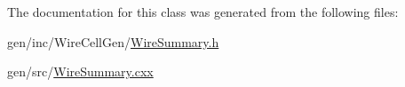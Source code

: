 The documentation for this class was generated from the following files\+:\begin{DoxyCompactItemize}
\item 
gen/inc/\+Wire\+Cell\+Gen/\hyperlink{_wire_summary_8h}{Wire\+Summary.\+h}\item 
gen/src/\hyperlink{_wire_summary_8cxx}{Wire\+Summary.\+cxx}\end{DoxyCompactItemize}
